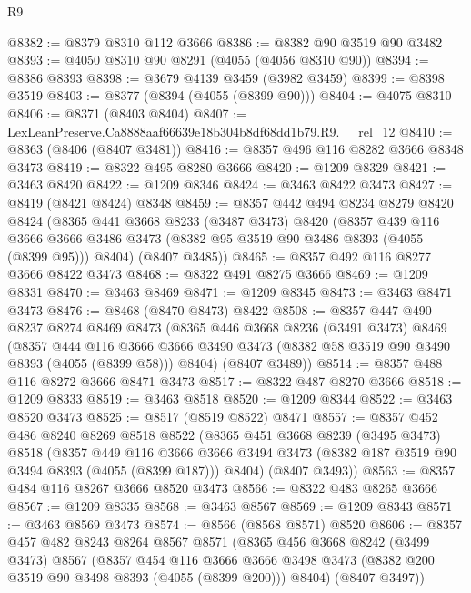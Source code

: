 \begin{lexlean}{R9}
\begin{coremodule}
@8382 := @8379 @8310 @112 @3666
@8386 := @8382 @90 @3519 @90 @3482
@8393 := @4050 @8310 @90 @8291 (@4055 (@4056 @8310 @90))
@8394 := @8386 @8393
@8398 := @3679 @4139 @3459 (@3982 @3459)
@8399 := @8398 @3519
@8403 := @8377 (@8394 (@4055 (@8399 @90)))
@8404 := @4075 @8310
@8406 := @8371 (@8403 @8404)
@8407 := LexLeanPreserve.Ca8888aaf66639e18b304b8df68dd1b79.R9.__rel_12
@8410 := @8363 (@8406 (@8407 @3481))
@8416 := @8357 @496 @116 @8282 @3666 @8348 @3473
@8419 := @8322 @495 @8280 @3666
@8420 := @1209 @8329
@8421 := @3463 @8420
@8422 := @1209 @8346
@8424 := @3463 @8422 @3473
@8427 := @8419 (@8421 @8424) @8348
@8459 := @8357
    @442
    @494
    @8234
    @8279
    @8420
    @8424
    (@8365
      @441
      @3668
      @8233
      (@3487 @3473)
      @8420
      (@8357
        @439
        @116
        @3666
        @3666
        @3486
        @3473
        (@8382 @95 @3519 @90 @3486 @8393 (@4055 (@8399 @95)))
        @8404)
      (@8407 @3485))
@8465 := @8357 @492 @116 @8277 @3666 @8422 @3473
@8468 := @8322 @491 @8275 @3666
@8469 := @1209 @8331
@8470 := @3463 @8469
@8471 := @1209 @8345
@8473 := @3463 @8471 @3473
@8476 := @8468 (@8470 @8473) @8422
@8508 := @8357
    @447
    @490
    @8237
    @8274
    @8469
    @8473
    (@8365
      @446
      @3668
      @8236
      (@3491 @3473)
      @8469
      (@8357
        @444
        @116
        @3666
        @3666
        @3490
        @3473
        (@8382 @58 @3519 @90 @3490 @8393 (@4055 (@8399 @58)))
        @8404)
      (@8407 @3489))
@8514 := @8357 @488 @116 @8272 @3666 @8471 @3473
@8517 := @8322 @487 @8270 @3666
@8518 := @1209 @8333
@8519 := @3463 @8518
@8520 := @1209 @8344
@8522 := @3463 @8520 @3473
@8525 := @8517 (@8519 @8522) @8471
@8557 := @8357
    @452
    @486
    @8240
    @8269
    @8518
    @8522
    (@8365
      @451
      @3668
      @8239
      (@3495 @3473)
      @8518
      (@8357
        @449
        @116
        @3666
        @3666
        @3494
        @3473
        (@8382 @187 @3519 @90 @3494 @8393 (@4055 (@8399 @187)))
        @8404)
      (@8407 @3493))
@8563 := @8357 @484 @116 @8267 @3666 @8520 @3473
@8566 := @8322 @483 @8265 @3666
@8567 := @1209 @8335
@8568 := @3463 @8567
@8569 := @1209 @8343
@8571 := @3463 @8569 @3473
@8574 := @8566 (@8568 @8571) @8520
@8606 := @8357
    @457
    @482
    @8243
    @8264
    @8567
    @8571
    (@8365
      @456
      @3668
      @8242
      (@3499 @3473)
      @8567
      (@8357
        @454
        @116
        @3666
        @3666
        @3498
        @3473
        (@8382 @200 @3519 @90 @3498 @8393 (@4055 (@8399 @200)))
        @8404)
      (@8407 @3497))

\end{coremodule}
\end{lexlean}
